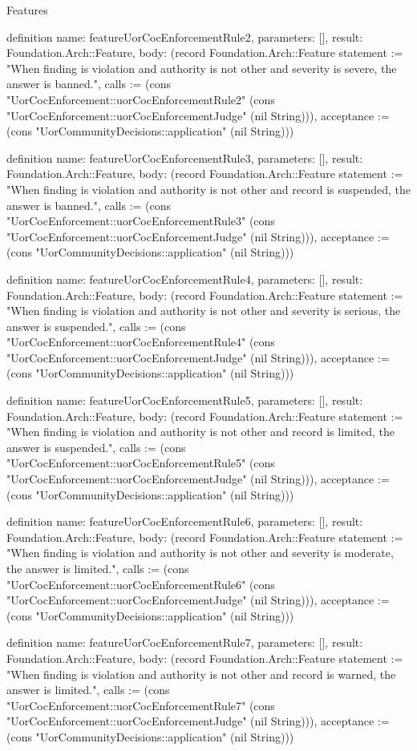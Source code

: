 \begin{lexlean}{Features}
\begin{semanticmodule}
definition{
  name: featureUorCocEnforcementRule2,
  parameters: [],
  result: Foundation.Arch::Feature,
  body: (record Foundation.Arch::Feature {statement := "When finding is violation and authority is not other and severity is severe, the answer is banned.", calls := (cons "UorCocEnforcement::uorCocEnforcementRule2" (cons "UorCocEnforcement::uorCocEnforcementJudge" (nil String))), acceptance := (cons "UorCommunityDecisions::application" (nil String))})
}

definition{
  name: featureUorCocEnforcementRule3,
  parameters: [],
  result: Foundation.Arch::Feature,
  body: (record Foundation.Arch::Feature {statement := "When finding is violation and authority is not other and record is suspended, the answer is banned.", calls := (cons "UorCocEnforcement::uorCocEnforcementRule3" (cons "UorCocEnforcement::uorCocEnforcementJudge" (nil String))), acceptance := (cons "UorCommunityDecisions::application" (nil String))})
}

definition{
  name: featureUorCocEnforcementRule4,
  parameters: [],
  result: Foundation.Arch::Feature,
  body: (record Foundation.Arch::Feature {statement := "When finding is violation and authority is not other and severity is serious, the answer is suspended.", calls := (cons "UorCocEnforcement::uorCocEnforcementRule4" (cons "UorCocEnforcement::uorCocEnforcementJudge" (nil String))), acceptance := (cons "UorCommunityDecisions::application" (nil String))})
}

definition{
  name: featureUorCocEnforcementRule5,
  parameters: [],
  result: Foundation.Arch::Feature,
  body: (record Foundation.Arch::Feature {statement := "When finding is violation and authority is not other and record is limited, the answer is suspended.", calls := (cons "UorCocEnforcement::uorCocEnforcementRule5" (cons "UorCocEnforcement::uorCocEnforcementJudge" (nil String))), acceptance := (cons "UorCommunityDecisions::application" (nil String))})
}

definition{
  name: featureUorCocEnforcementRule6,
  parameters: [],
  result: Foundation.Arch::Feature,
  body: (record Foundation.Arch::Feature {statement := "When finding is violation and authority is not other and severity is moderate, the answer is limited.", calls := (cons "UorCocEnforcement::uorCocEnforcementRule6" (cons "UorCocEnforcement::uorCocEnforcementJudge" (nil String))), acceptance := (cons "UorCommunityDecisions::application" (nil String))})
}

definition{
  name: featureUorCocEnforcementRule7,
  parameters: [],
  result: Foundation.Arch::Feature,
  body: (record Foundation.Arch::Feature {statement := "When finding is violation and authority is not other and record is warned, the answer is limited.", calls := (cons "UorCocEnforcement::uorCocEnforcementRule7" (cons "UorCocEnforcement::uorCocEnforcementJudge" (nil String))), acceptance := (cons "UorCommunityDecisions::application" (nil String))})
}


\end{semanticmodule}
\end{lexlean}
